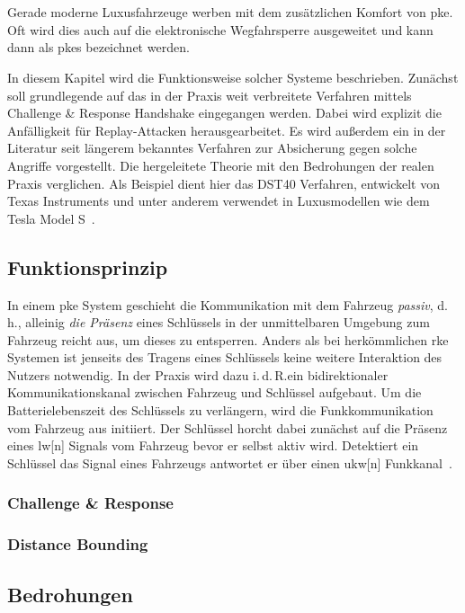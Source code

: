 \chapter{}

Gerade moderne Luxusfahrzeuge werben mit dem zusätzlichen Komfort von \gls{pke}. Oft wird dies auch auf die elektronische Wegfahrsperre ausgeweitet und kann dann als \gls{pkes} bezeichnet werden.

In diesem Kapitel wird die Funktionsweise solcher Systeme beschrieben. Zunächst soll grundlegende auf das in der Praxis weit verbreitete Verfahren mittels \foreignlanguage{english}{Challenge \& Response Handshake} eingegangen werden. Dabei wird explizit die Anfälligkeit für \foreignlanguage{english}{Replay}-Attacken herausgearbeitet. Es wird außerdem ein in der Literatur seit längerem bekanntes Verfahren zur Absicherung gegen solche Angriffe vorgestellt. Die hergeleitete Theorie mit den Bedrohungen der realen Praxis verglichen. Als Beispiel dient hier das DST40 Verfahren, entwickelt von Texas Instruments und unter anderem verwendet in Luxusmodellen wie dem Tesla Model S~\cite{Wouters2019}.

\section{Funktionsprinzip}

In einem \gls{pke} System geschieht die Kommunikation mit dem Fahrzeug \emph{passiv}, d.\,h., alleinig \emph{die Präsenz} eines Schlüssels in der unmittelbaren Umgebung zum Fahrzeug reicht aus, um dieses zu entsperren. Anders als bei herkömmlichen \gls{rke} Systemen ist jenseits des Tragens eines Schlüssels keine weitere Interaktion des Nutzers notwendig. In der Praxis wird dazu i.\,d.\,R.\@ ein bidirektionaler Kommunikationskanal zwischen Fahrzeug und Schlüssel aufgebaut. Um die Batterielebenszeit des Schlüssels zu verlängern, wird die Funkkommunikation vom Fahrzeug aus initiiert. Der Schlüssel horcht dabei zunächst auf die Präsenz eines \gls{lw}[n] Signals vom Fahrzeug bevor er selbst aktiv wird. Detektiert ein Schlüssel das Signal eines Fahrzeugs antwortet er über einen \gls{ukw}[n] Funkkanal~\cite{Alrabady2005,Verdult2015,Garcia2016}.

\subsection{\foreignlanguage{english}{Challenge \& Response}}

\subsection{\foreignlanguage{english}{Distance Bounding}}

\section{Bedrohungen}
